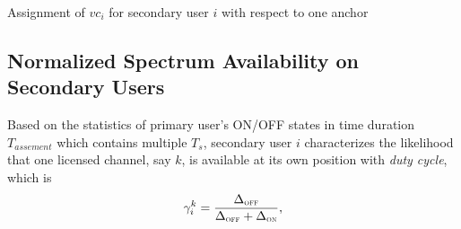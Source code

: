 \begin{algorithm}[!h]
\caption{Assignment of $vc_i$ for secondary user $i$ with respect to one anchor}%
\label{algo:receiveAnchorMessage}
\DontPrintSemicolon
\SetAlgoLined
{}

\end{algorithm}






\subsection{Normalized Spectrum Availability on Secondary Users}\label{CA_VC_likelihood}
Based on the statistics of primary user's ON/OFF states in time duration $T_{assement}$ which contains multiple $T_s$, secondary user $i$ characterizes the likelihood that one licensed channel, say $k$, is available at its own position with \textit{duty cycle}, which is
\begin{equation}
\label{gamma}
\gamma_i^k = \frac{\Delta_{\textsc{\tiny OFF}}}{\Delta_{\textsc{\tiny OFF}}+\Delta_{\textsc{\tiny ON}}},
\end{equation}

